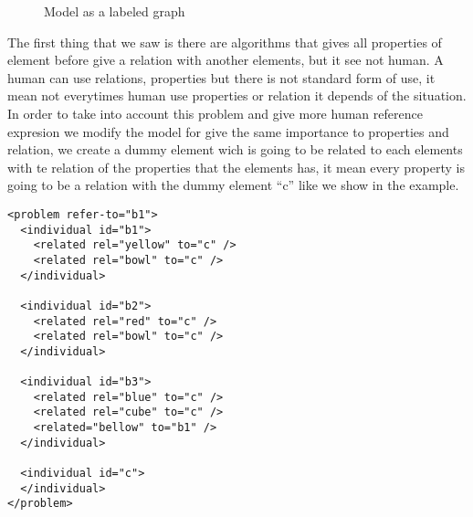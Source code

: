 \begin{figure}[ht]
\begin{minipage}[b]{0.5\linewidth}
\caption{Model as a labeled graph}
\label{GRE3D7-stimulus-graph}
\end{minipage}
\end{figure}



The first thing that we saw is there are algorithms that gives all properties of element before give a relation with another elements, but it see not human. A human can use relations, properties but there is not standard form of use, it mean not everytimes human use properties or relation it depends of the situation. In order to take into account this problem and give more human reference expresion we modify the model for give the same importance to properties and relation, we create a dummy element wich is going to be related to each elements with te relation of the properties that the elements has, it mean every property is going to be a relation with the dummy element ``c'' like we show in the example.

\begin{verbatim}
<problem refer-to="b1">
  <individual id="b1">
    <related rel="yellow" to="c" />
    <related rel="bowl" to="c" />
  </individual>

  <individual id="b2">
    <related rel="red" to="c" />
    <related rel="bowl" to="c" />
  </individual>

  <individual id="b3">
    <related rel="blue" to="c" />
    <related rel="cube" to="c" />
    <related="bellow" to="b1" />
  </individual>
  
  <individual id="c">
  </individual>
</problem>
\end{verbatim}


